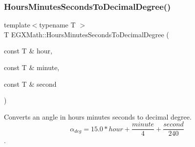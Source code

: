 \mbox{\label{group___e_g_x_math-_angle_conversions-_hours_minutes_seconds_gad6662d1113ae8aea6baca6317888b4cd}} 
\subsubsection{\texorpdfstring{Hours\+Minutes\+Seconds\+To\+Decimal\+Degree()}{HoursMinutesSecondsToDecimalDegree()}}
{\footnotesize\ttfamily template$<$typename T $>$ \\
T E\+G\+X\+Math\+::\+Hours\+Minutes\+Seconds\+To\+Decimal\+Degree (\begin{DoxyParamCaption}\item[{const T \&}]{hour,  }\item[{const T \&}]{minute,  }\item[{const T \&}]{second }\end{DoxyParamCaption})}



Converts an angle in hours minutes seconds to decimal degree. \[\alpha_{deg}=15.0 * hour + \frac{minute}{4} + \frac{second}{240}\]. 

